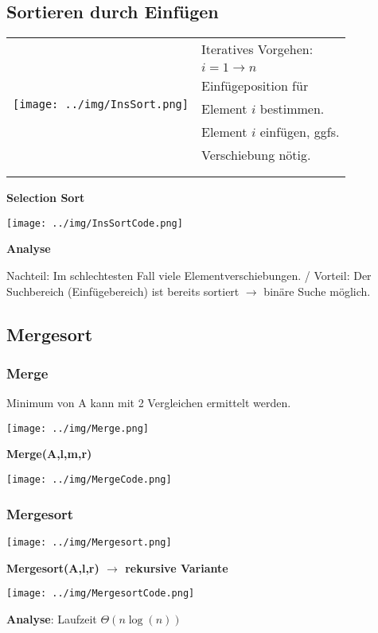 \documentclass[german]{latex4ei/latex4ei_sheet}
\begin{document}
\begin{sectionbox}
\subsection{Sortieren durch Einfügen}\smallskip
\begin{tabular*}{\columnwidth}{@{\extracolsep\fill}ll@{}}
\multirow{7}{*}{\texttt{[image: ../img/InsSort.png]}}
& Iteratives Vorgehen: \\
& $i=1\rightarrow n$ \smallskip \\
& Einfügeposition für \\
& Element $i$ bestimmen. \smallskip\\
& Element $i$ einfügen, ggfs.\\
& Verschiebung nötig. \smallskip\\
& \\
& \\
\end{tabular*}\smallskip

\textbf{Selection Sort}\par
\texttt{[image: ../img/InsSortCode.png]}\par\smallskip

\textbf{Analyse}\par
Nachteil: Im schlechtesten Fall viele Elementverschiebungen. / Vorteil:  Der Suchbereich (Einfügebereich) ist bereits sortiert $\rightarrow$ binäre Suche möglich.

\end{sectionbox}

\begin{sectionbox}
\subsection{Mergesort}\smallskip
\subsubsection{Merge}\smallskip
Minimum von A kann mit 2 Vergleichen ermittelt werden.\par
\begin{center}
    \texttt{[image: ../img/Merge.png]}
\end{center}\smallskip
\textbf{Merge(A,l,m,r)}\par
\texttt{[image: ../img/MergeCode.png]}
\smallskip

\subsubsection{Mergesort}
\begin{center}
    \texttt{[image: ../img/Mergesort.png]}
\end{center}\smallskip
\textbf{Mergesort(A,l,r) $\rightarrow$ rekursive Variante}\par
\texttt{[image: ../img/MergesortCode.png]}
\par\smallskip
\textbf{Analyse}: Laufzeit  $\Theta(n \operatorname{log}(n))$
\end{sectionbox}
\end{document}

